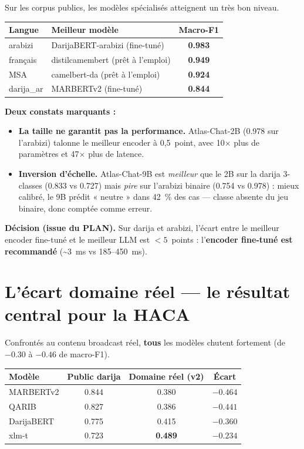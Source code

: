 \documentclass[11pt, a4paper]{article}
\begin{document}
Sur les corpus publics, les modèles spécialisés atteignent un très bon niveau.

\begin{center}
\small
\begin{tabular}{llc}
\toprule
\textbf{Langue} & \textbf{Meilleur modèle} & \textbf{Macro-F1} \\
\midrule
arabizi    & DarijaBERT-arabizi (fine-tuné) & \textbf{0.983} \\
français   & distilcamembert (prêt à l'emploi) & \textbf{0.949} \\
MSA        & camelbert-da (prêt à l'emploi) & \textbf{0.924} \\
darija\_ar & MARBERTv2 (fine-tuné) & \textbf{0.844} \\
\bottomrule
\end{tabular}
\end{center}

\textbf{Deux constats marquants :}
\begin{itemize}[leftmargin=1.2em, itemsep=2pt]
  \item \textbf{La taille ne garantit pas la performance.} Atlas-Chat-2B
  (0.978 sur l'arabizi) talonne le meilleur encoder à 0,5~point, avec 10$\times$
  plus de paramètres et 47$\times$ plus de latence.
  \item \textbf{Inversion d'échelle.} Atlas-Chat-9B est \emph{meilleur} que le 2B
  sur la darija 3-classes (0.833 vs 0.727) mais \emph{pire} sur l'arabizi binaire
  (0.754 vs 0.978) : mieux calibré, le 9B prédit « neutre » dans 42~\% des cas
  — classe absente du jeu binaire, donc comptée comme erreur.
\end{itemize}

\textbf{Décision (issue du PLAN).} Sur darija et arabizi, l'écart entre le
meilleur encoder fine-tuné et le meilleur LLM est $<5$~points : l'\textbf{encoder
fine-tuné est recommandé} (\textasciitilde3~ms vs 185--450~ms).

\section{L'écart domaine réel — le résultat central pour la HACA}

Confrontés au contenu broadcast réel, \textbf{tous} les modèles chutent
fortement (de $-0.30$ à $-0.46$ de macro-F1).

\begin{center}
\small
\begin{tabular}{lccc}
\toprule
\textbf{Modèle} & \textbf{Public darija} & \textbf{Domaine réel (v2)} & \textbf{Écart} \\
\midrule
MARBERTv2  & 0.844 & 0.380 & \textcolor{warnred}{$-0.464$} \\
QARIB      & 0.827 & 0.386 & \textcolor{warnred}{$-0.441$} \\
DarijaBERT & 0.775 & 0.415 & $-0.360$ \\
xlm-t      & 0.723 & \textbf{0.489} & $-0.234$ \\
\bottomrule
\end{tabular}
\end{center}
\end{document}
